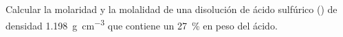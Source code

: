 Calcular la molaridad y la molalidad de una disolución de ácido sulfúrico () de densidad \SI{1,198}{\gram\per\cubic\centi\meter} que contiene un \SI{27}{\percent} en peso del ácido.
